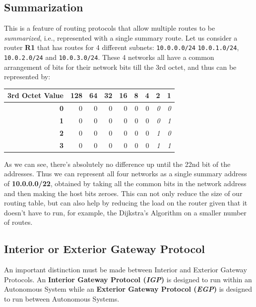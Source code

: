 \subsection{Summarization}
This is a feature of routing protocols that allow multiple routes to be \textit{summarized}, i.e., represented with a single summary route. Let us consider a router \textbf{R1} that has routes for 4 different subnets: \verb|10.0.0.0/24| \verb|10.0.1.0/24|, \verb|10.0.2.0/24| and \verb|10.0.3.0/24|. These 4 networks all have a common arrangement of bits for their network bits till the 3rd octet, and thus can be represented by:

\vspace{-10pt}
\noindent
\begin{center}
	\begin{tabular}{rrrrrrrrr}
		\toprule
		\textbf{3rd Octet Value} &128 &64 &32 &16 &8 &4 &2 &1 \\
		\midrule
		\textbf{0} &0&0&0&0&0&0&\textit{0}&\textit{0} \\
		\textbf{1} &0&0&0&0&0&0&\textit{0}&\textit{1} \\
		\textbf{2} &0&0&0&0&0&0&\textit{1}&\textit{0} \\
		\textbf{3} &0&0&0&0&0&0&\textit{1}&\textit{1} \\
		\bottomrule
	\end{tabular}
\end{center}
\vspace{-5pt}

\noindent
As we can see, there's absolutely no difference up until the 22nd bit of the addresses. Thus we can represent all four networks as a single summary address of \textbf{10.0.0.0/22}, obtained by taking all the common bits in the network address and then making the host bits zeroes. This can not only reduce the size of our routing table, but can also help by reducing the load on the router given that it doesn't have to run, for example, the Dijkstra's Algorithm on a smaller number of routes. 

\subsection{Interior or Exterior Gateway Protocol} 
An important distinction must be made between Interior and Exterior Gateway Protocols. An \textbf{Interior Gateway Protocol (\textit{IGP})} is designed to run within an Autonomous System while an \textbf{Exterior Gateway Protocol (\textit{EGP})} is designed to run between Autonomous Systems. 

